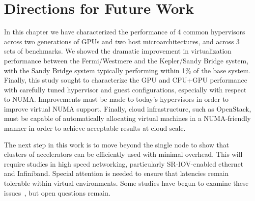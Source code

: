 \section{Directions for Future Work}\label{FUTURE}
In this chapter we have characterized the performance of 4 common hypervisors
across two generations of GPUs and two host microarchitectures, and across 3
sets of benchmarks.  We showed the dramatic improvement in virtualization
performance between the Fermi/Westmere and the Kepler/Sandy Bridge system, with
the Sandy Bridge system typically performing within 1\% of the base system.
Finally, this study sought to characterize the GPU and CPU+GPU performance with
carefully tuned hypervisor and guest configurations, especially with respect to
NUMA.  Improvements must be made to today's hypervisors in order
to improve virtual NUMA support. Finally, cloud infrastructure, such as OpenStack, must be capable
of automatically allocating virtual machines in a NUMA-friendly manner in order
to achieve acceptable results at cloud-scale.


The next step in this work is to move beyond the single node to show that
clusters of accelerators can be efficiently used with minimal overhead.  This
will require studies in high speed networking, particularly SR-IOV-enabled 
ethernet and Infiniband.  Special attention is needed to ensure that
latencies remain tolerable within virtual environments.  Some studies have begun
to examine these issues~\cite{SRIOVInfiniband}, but open questions remain.








